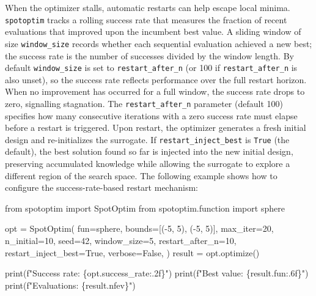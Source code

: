\documentclass[
  twocolumn]{article}
\newenvironment{Shaded}{\begin{snugshade}}{\end{snugshade}}
\newcommand{\BuiltInTok}[1]{\textcolor[rgb]{0.00,0.23,0.31}{#1}}
\newcommand{\DecValTok}[1]{\textcolor[rgb]{0.68,0.00,0.00}{#1}}
\newcommand{\ImportTok}[1]{\textcolor[rgb]{0.00,0.46,0.62}{#1}}
\newcommand{\NormalTok}[1]{\textcolor[rgb]{0.00,0.23,0.31}{#1}}
\newcommand{\OperatorTok}[1]{\textcolor[rgb]{0.37,0.37,0.37}{#1}}
\newcommand{\SpecialCharTok}[1]{\textcolor[rgb]{0.37,0.37,0.37}{#1}}
\newcommand{\SpecialStringTok}[1]{\textcolor[rgb]{0.13,0.47,0.30}{#1}}
\newcommand{\VariableTok}[1]{\textcolor[rgb]{0.07,0.07,0.07}{#1}}
\begin{document}
When the optimizer stalls, automatic restarts can help escape local
minima. \texttt{spotoptim} tracks a rolling success rate that measures
the fraction of recent evaluations that improved upon the incumbent best
value. A sliding window of size \texttt{window\_size} records whether
each sequential evaluation achieved a new best; the success rate is the
number of successes divided by the window length. By default
\texttt{window\_size} is set to \texttt{restart\_after\_n} (or 100 if
\texttt{restart\_after\_n} is also unset), so the success rate reflects
performance over the full restart horizon. When no improvement has
occurred for a full window, the success rate drops to zero, signalling
stagnation. The \texttt{restart\_after\_n} parameter (default 100)
specifies how many consecutive iterations with a zero success rate must
elapse before a restart is triggered. Upon restart, the optimizer
generates a fresh initial design and re-initializes the surrogate. If
\texttt{restart\_inject\_best} is \texttt{True} (the default), the best
solution found so far is injected into the new initial design,
preserving accumulated knowledge while allowing the surrogate to explore
a different region of the search space. The following example shows how
to configure the success-rate-based restart mechanism:

\begin{Shaded}
\begin{Highlighting}[]
\ImportTok{from}\NormalTok{ spotoptim }\ImportTok{import}\NormalTok{ SpotOptim}
\ImportTok{from}\NormalTok{ spotoptim.function }\ImportTok{import}\NormalTok{ sphere}

\NormalTok{opt }\OperatorTok{=}\NormalTok{ SpotOptim(}
\NormalTok{    fun}\OperatorTok{=}\NormalTok{sphere,}
\NormalTok{    bounds}\OperatorTok{=}\NormalTok{[(}\OperatorTok{{-}}\DecValTok{5}\NormalTok{, }\DecValTok{5}\NormalTok{), (}\OperatorTok{{-}}\DecValTok{5}\NormalTok{, }\DecValTok{5}\NormalTok{)],}
\NormalTok{    max\_iter}\OperatorTok{=}\DecValTok{20}\NormalTok{,}
\NormalTok{    n\_initial}\OperatorTok{=}\DecValTok{10}\NormalTok{,}
\NormalTok{    seed}\OperatorTok{=}\DecValTok{42}\NormalTok{,}
\NormalTok{    window\_size}\OperatorTok{=}\DecValTok{5}\NormalTok{,}
\NormalTok{    restart\_after\_n}\OperatorTok{=}\DecValTok{10}\NormalTok{,}
\NormalTok{    restart\_inject\_best}\OperatorTok{=}\VariableTok{True}\NormalTok{,}
\NormalTok{    verbose}\OperatorTok{=}\VariableTok{False}\NormalTok{,}
\NormalTok{)}
\NormalTok{result }\OperatorTok{=}\NormalTok{ opt.optimize()}

\BuiltInTok{print}\NormalTok{(}\SpecialStringTok{f"Success rate: }\SpecialCharTok{\{}\NormalTok{opt}\SpecialCharTok{.}\NormalTok{success\_rate}\SpecialCharTok{:.2f\}}\SpecialStringTok{"}\NormalTok{)}
\BuiltInTok{print}\NormalTok{(}\SpecialStringTok{f"Best value: }\SpecialCharTok{\{}\NormalTok{result}\SpecialCharTok{.}\NormalTok{fun}\SpecialCharTok{:.6f\}}\SpecialStringTok{"}\NormalTok{)}
\BuiltInTok{print}\NormalTok{(}\SpecialStringTok{f"Evaluations: }\SpecialCharTok{\{}\NormalTok{result}\SpecialCharTok{.}\NormalTok{nfev}\SpecialCharTok{\}}\SpecialStringTok{"}\NormalTok{)}
\end{Highlighting}
\end{Shaded}
\end{document}
